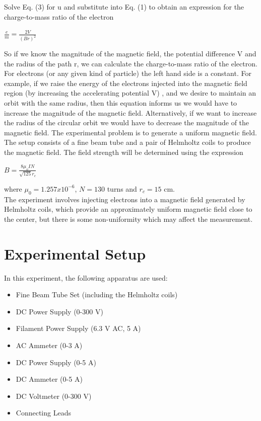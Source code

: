 \documentclass[aps,nofootinbib,onecolumn,groupedaddress,a4paper]{revtex4}
\begin{document}
Solve Eq. (3) for u and substitute into Eq. (1) to obtain an expression for the charge-to-mass ratio of the electron
\begin{center}
$\frac{e}{m}=\frac{2V}{(Br)^{2}}$
\end{center}

So if we know the magnitude of the magnetic field, the potential difference V and
the radius of the path r, we can calculate the charge-to-mass ratio of the
electron. For electrons (or any given kind of particle) the left hand side is a constant. For example, if we raise the energy of the electrons injected into  the magnetic field region (by increasing the accelerating potential V) , and we desire to maintain an orbit with the same radius, then this equation informs us we
would have to increase the magnitude of the magnetic field. Alternatively, if
we want to increase the radius of the circular orbit we would have to decrease
the magnitude of the magnetic field. The experimental problem is to generate a uniform magnetic field.\\

The setup consists of a fine beam tube and a pair of Helmholtz coils to produce the magnetic field. The field strength will be determined using the expression
\begin{center}

$B=\frac { 8{ \mu  }_{ o }IN }{ \sqrt { 125 } { r }_{ c } } $

\end{center}

where ${\mu}_{0}=1.257x10^{-6}$, $N=130$ turns and ${r}_{c}=15$ cm.\\



The experiment involves injecting electrons into a magnetic field generated by Helmholtz coils, which provide an approximately uniform magnetic field close to the center, but there is some non-uniformity which may affect the measurement.


\section{Experimental Setup}
In this experiment, the following apparatus are used:
\begin{itemize}
\item Fine Beam Tube Set (including the Helmholtz coils)
\item DC Power Supply (0-300 V)
\item Filament Power Supply (6.3 V AC, 5 A)
\item AC Ammeter (0-3 A)
\item DC Power Supply (0-5 A)
\item DC Ammeter (0-5 A)
\item DC Voltmeter (0-300 V)
\item Connecting Leads
\end{itemize}
\end{document}
